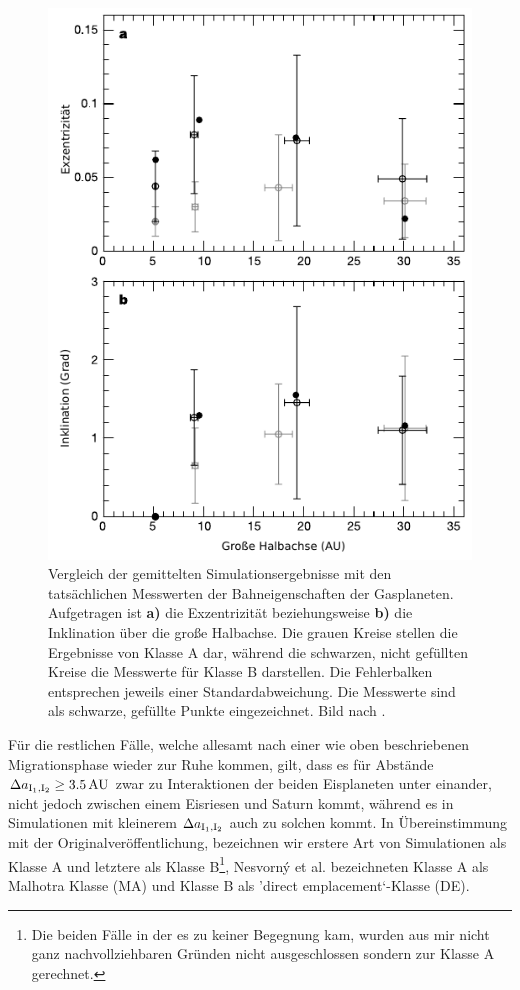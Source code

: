 \documentclass[12pt,a4paper,twoside]{article}
\newcommand{\AU}{\,\mathrm{AU}}
\begin{document}
\begin{figure}[tbn]
\centering
\includegraphics[scale=1]{img/Tsiganis2005-2.pdf}
\caption{Vergleich der gemittelten Simulationsergebnisse mit den tatsächlichen Messwerten der Bahneigenschaften der Gasplaneten. Aufgetragen ist \textbf{a)} die Exzentrizität beziehungsweise \textbf{b)} die Inklination über die große Halbachse. Die grauen Kreise stellen die Ergebnisse von Klasse A dar, während die schwarzen, nicht gefüllten Kreise die Messwerte für Klasse B darstellen. Die Fehlerbalken entsprechen jeweils einer Standardabweichung. Die Messwerte sind als schwarze, gefüllte Punkte eingezeichnet. Bild nach \cite{Tsiganis2005}.}
\label{fig:VergleichmitMesswerten}
\end{figure}
Für die restlichen Fälle, welche allesamt nach einer wie oben beschriebenen Migrationsphase wieder zur Ruhe kommen, %
gilt, dass es für Abstände $\DII \ge 3.5 \AU$ zwar zu Interaktionen der beiden Eisplaneten unter einander, nicht jedoch zwischen einem Eisriesen und Saturn kommt, während es in Simulationen mit kleinerem $\Delta a_{\mathrm{I}_1,\mathrm{I}_2}$ auch zu solchen kommt. In Übereinstimmung mit der Originalveröffentlichung, bezeichnen wir erstere Art von Simulationen als Klasse A und letztere als Klasse B\footnote{Die beiden Fälle in der es zu keiner Begegnung kam, wurden aus mir nicht ganz nachvollziehbaren Gründen nicht ausgeschlossen sondern zur Klasse A gerechnet.}, Nesvorný et al. bezeichneten Klasse A als Malhotra Klasse (MA) und Klasse B als 'direct emplacement`-Klasse (DE)\cite{Nesvorny2007}. %
\end{document}
